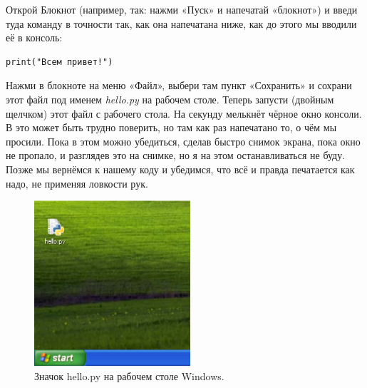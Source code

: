 \begin{WINDOWS}
Открой Блокнот (например, так: нажми «Пуск» и напечатай «блокнот») и введи туда команду в точности так, как она напечатана ниже, как до этого мы вводили её в консоль:

\begin{listing}
\begin{verbatim}
print("Всем привет!")
\end{verbatim}
\end{listing}

Нажми в блокноте на меню «Файл», выбери там пункт «Сохранить» и сохрани этот файл под именем \emph{hello.py} на рабочем столе. Теперь запусти (двойным щелчком) этот файл с рабочего стола. На секунду мелькнёт чёрное окно консоли. В это может быть трудно поверить, но там как раз напечатано то, о чём мы просили. Пока в этом можно убедиться, сделав быстро снимок экрана, пока окно не пропало, и разглядев это на снимке, но я на этом останавливаться не буду. Позже мы вернёмся к нашему коду и убедимся, что всё и правда печатается как надо, не применяя ловкости рук.

\begin{figure}
	\begin{center}
		\includegraphics[width=58mm]{../en/figure5.eps}
	\end{center}
	\caption{Значок hello.py на рабочем столе Windows.}\label{fig5}
\end{figure}
\end{WINDOWS}


